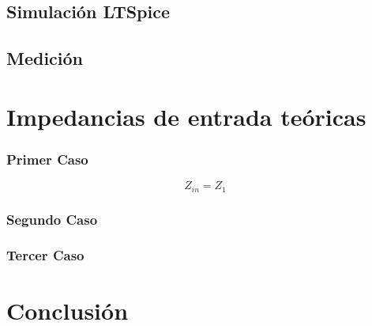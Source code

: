 \documentclass[11pt, a4paper]{article}
\begin{document}
\subsection{Simulación LTSpice}

\subsection{Medición}

\section{Impedancias de entrada teóricas}
\subsubsection{Primer Caso}
\begin{equation}
	Z_{in}=Z_1
\end{equation}
\subsubsection{Segundo Caso}

\subsubsection{Tercer Caso}
\section{Conclusión}
\end{document}
